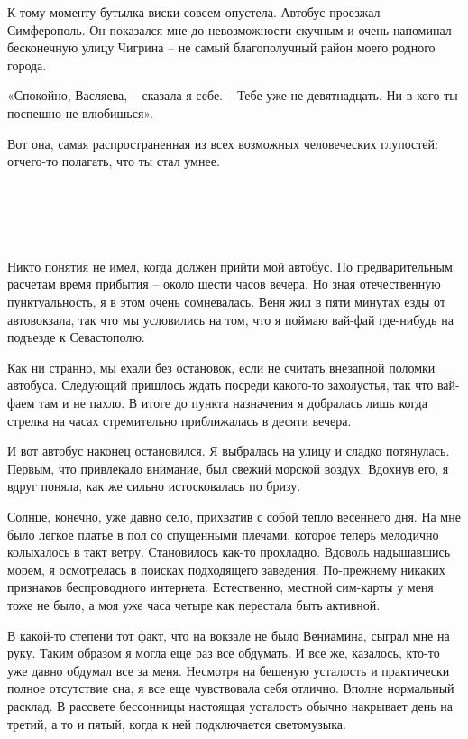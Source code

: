 \documentclass[
]{book}
\begin{document}
К тому моменту бутылка виски совсем опустела. Автобус проезжал Симферополь. Он показался мне до невозможности скучным и очень напоминал бесконечную улицу Чигрина -- не самый благополучный район моего родного города.

«Спокойно, Васляева, -- сказала я себе. -- Тебе уже не девятнадцать. Ни в кого ты поспешно не влюбишься».

Вот она, самая распространенная из всех возможных человеческих глупостей: отчего-то полагать, что ты стал умнее.

\hypertarget{chapter-7}{%
\chapter{~}\label{chapter-7}}

Никто понятия не имел, когда должен прийти мой автобус. По предварительным расчетам время прибытия -- около шести часов вечера. Но зная отечественную пунктуальность, я в этом очень сомневалась. Веня жил в пяти минутах езды от автовокзала, так что мы условились на том, что я поймаю вай-фай где-нибудь на подъезде к Севастополю.

Как ни странно, мы ехали без остановок, если не считать внезапной поломки автобуса. Следующий пришлось ждать посреди какого-то захолустья, так что вай-фаем там и не пахло. В итоге до пункта назначения я добралась лишь когда стрелка на часах стремительно приближалась в десяти вечера.

И вот автобус наконец остановился. Я выбралась на улицу и сладко потянулась. Первым, что привлекало внимание, был свежий морской воздух. Вдохнув его, я вдруг поняла, как же сильно истосковалась по бризу.

Солнце, конечно, уже давно село, прихватив с собой тепло весеннего дня. На мне было легкое платье в пол со спущенными плечами, которое теперь мелодично колыхалось в такт ветру. Становилось как-то прохладно. Вдоволь надышавшись морем, я осмотрелась в поисках подходящего заведения. По-прежнему никаких признаков беспроводного интернета. Естественно, местной сим-карты у меня тоже не было, а моя уже часа четыре как перестала быть активной.

В какой-то степени тот факт, что на вокзале не было Вениамина, сыграл мне на руку. Таким образом я могла еще раз все обдумать. И все же, казалось, кто-то уже давно обдумал все за меня. Несмотря на бешеную усталость и практически полное отсутствие сна, я все еще чувствовала себя отлично. Вполне нормальный расклад. В рассвете бессонницы настоящая усталость обычно накрывает день на третий, а то и пятый, когда к ней подключается светомузыка.
\end{document}
